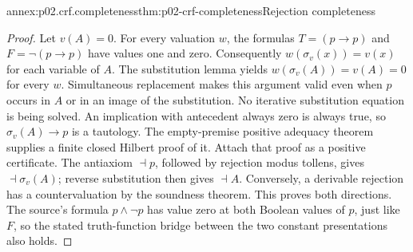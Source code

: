 \begin{annexitem}{annex:p02.crf.completeness}{thm:p02-crf-completeness}{Rejection completeness}
\begin{proof}
Let \(v(A)=0\). For every valuation \(w\), the formulas
\(T=(p\to p)\) and \(F=\neg(p\to p)\) have values one
and zero. Consequently \(w(\sigma_v(x))=v(x)\) for each variable
of \(A\). The substitution lemma yields
\(w(\sigma_v(A))=v(A)=0\) for every \(w\). Simultaneous
replacement makes this argument valid even when \(p\) occurs in
\(A\) or in an image of the substitution. No iterative substitution
equation is being solved.
An implication with antecedent always zero is always true, so
\(\sigma_v(A)\to p\) is a tautology. The empty-premise positive
adequacy theorem supplies a finite closed Hilbert proof of it.
Attach that proof as a positive certificate. The antiaxiom
\(\dashv p\), followed by rejection modus tollens, gives
\(\dashv\sigma_v(A)\); reverse substitution then gives
\(\dashv A\). Conversely, a derivable rejection has a
countervaluation by the soundness theorem. This proves both
directions. The source's formula \(p\land\neg p\) has value
zero at both Boolean values of \(p\), just like \(F\), so the
stated truth-function bridge between the two constant presentations
also holds.


\end{proof}
\end{annexitem}
